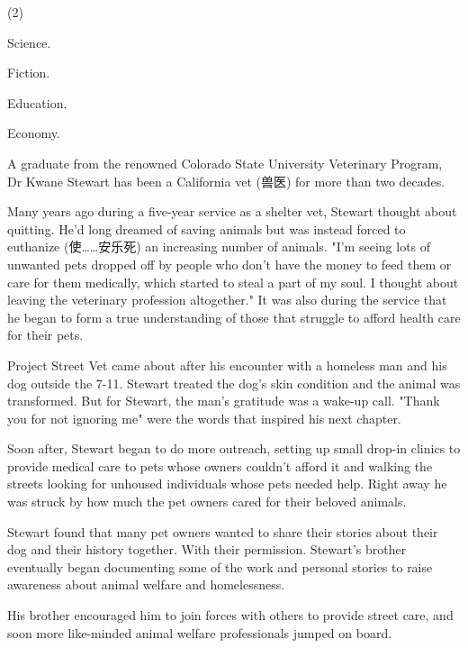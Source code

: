 \documentclass{英语试卷}
\begin{document}
\begin{choices}(2)
  \item Science.
  \item Fiction.
  \item Education.
  \item Economy.
\end{choices}
\par A graduate from the renowned Colorado State University Veterinary Program, Dr Kwane Stewart has been a California vet (兽医) for more than two decades.\par
\par Many years ago during a five-year service as a shelter vet, Stewart thought about quitting. He’d long dreamed of saving animals but was instead forced to euthanize (使……安乐死) an increasing number of animals. "I’m seeing lots of unwanted pets dropped off by people who don’t have the money to feed them or care for them medically, which started to steal a part of my soul. I thought about leaving the veterinary profession altogether." It was also during the service that he began to form a true understanding of those that struggle to afford health care for their pets.\par
\par Project Street Vet came about after his encounter with a homeless man and his dog outside the 7-11. Stewart treated the dog's skin condition and the animal was transformed. But for Stewart, the man's gratitude was a wake-up call. "Thank you for not ignoring me" were the words that inspired his next chapter.\par
\par Soon after, Stewart began to do more outreach, setting up small drop-in clinics to provide medical care to pets whose owners couldn't afford it and walking the streets looking for unhoused individuals whose pets needed help. Right away he was struck by how much the pet owners cared for their beloved animals.\par
\par Stewart found that many pet owners wanted to share their stories about their dog and their history together. With their permission. Stewart's brother eventually began documenting some of the work and personal stories to raise awareness about animal welfare and homelessness.\par
\par His brother encouraged him to join forces with others to provide street care, and soon more like-minded animal welfare professionals jumped on board.\par
\end{document}
